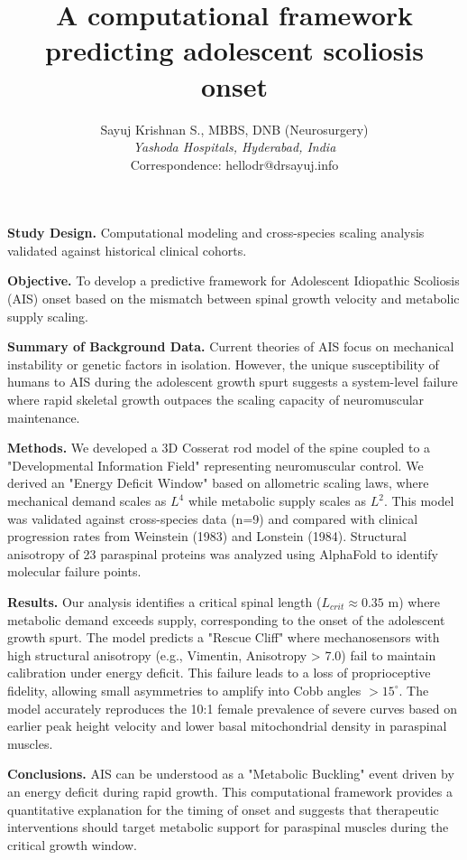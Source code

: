\documentclass[11pt]{article}
\title{A computational framework predicting adolescent scoliosis onset}
\author{Sayuj Krishnan S., MBBS, DNB (Neurosurgery) \\
\textit{Yashoda Hospitals, Hyderabad, India} \\
Correspondence: hellodr@drsayuj.info}
\date{}
\begin{document}
\maketitle

\textbf{Study Design.} Computational modeling and cross-species scaling analysis validated against historical clinical cohorts.

\textbf{Objective.} To develop a predictive framework for Adolescent Idiopathic Scoliosis (AIS) onset based on the mismatch between spinal growth velocity and metabolic supply scaling.

\textbf{Summary of Background Data.} Current theories of AIS focus on mechanical instability or genetic factors in isolation. However, the unique susceptibility of humans to AIS during the adolescent growth spurt suggests a system-level failure where rapid skeletal growth outpaces the scaling capacity of neuromuscular maintenance.

\textbf{Methods.} We developed a 3D Cosserat rod model of the spine coupled to a "Developmental Information Field" representing neuromuscular control. We derived an "Energy Deficit Window" based on allometric scaling laws, where mechanical demand scales as $L^4$ while metabolic supply scales as $L^2$. This model was validated against cross-species data (n=9) and compared with clinical progression rates from Weinstein (1983) and Lonstein (1984). Structural anisotropy of 23 paraspinal proteins was analyzed using AlphaFold to identify molecular failure points.

\textbf{Results.} Our analysis identifies a critical spinal length ($L_{crit} \approx 0.35$ m) where metabolic demand exceeds supply, corresponding to the onset of the adolescent growth spurt. The model predicts a "Rescue Cliff" where mechanosensors with high structural anisotropy (e.g., Vimentin, Anisotropy > 7.0) fail to maintain calibration under energy deficit. This failure leads to a loss of proprioceptive fidelity, allowing small asymmetries to amplify into Cobb angles $>15^\circ$. The model accurately reproduces the 10:1 female prevalence of severe curves based on earlier peak height velocity and lower basal mitochondrial density in paraspinal muscles.

\textbf{Conclusions.} AIS can be understood as a "Metabolic Buckling" event driven by an energy deficit during rapid growth. This computational framework provides a quantitative explanation for the timing of onset and suggests that therapeutic interventions should target metabolic support for paraspinal muscles during the critical growth window.
\end{document}

